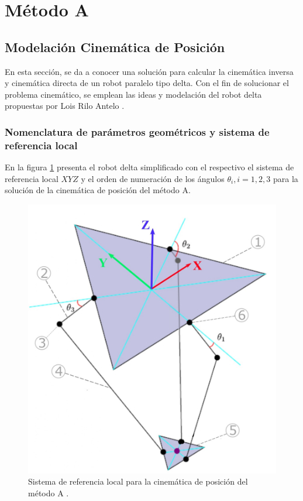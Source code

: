      \newpage
     

\section{Método A}

    \subsection{Modelación Cinemática de Posición}
    
        En esta sección, se da a conocer una solución para calcular la cinemática inversa y cinemática directa de un robot paralelo tipo delta. Con el fin de solucionar el problema cinemático, se emplean las ideas y modelación del robot delta propuestas por Lois Rilo Antelo \cite{Diseno_e_implementacion_de_un_sistema_de_control_para_la_representacion_grafica_a_partir_de_imagenes}.
        
        \subsubsection{Nomenclatura de parámetros geométricos y sistema de referencia local}
        En la figura  \ref{f:Cap4_Metodo_A_Modelacion_Cinematica_Posicion_1}  presenta el robot delta simplificado con el respectivo el sistema de referencia local $XYZ$ y el orden de numeración de los ángulos $\theta_i , i=1,2,3$ para la solución de la cinemática de posición del método A.
        
        \begin{figure}[htb]
             \centering
             \includegraphics[width=0.45\linewidth]{Main/Chapter4/Images4/DIBUJO2.jpg}
              \caption{Sistema de referencia local para la cinemática de posición del método A \cite{Diseno_e_implementacion_de_un_sistema_de_control_para_la_representacion_grafica_a_partir_de_imagenes}. }
              \label{f:Cap4_Metodo_A_Modelacion_Cinematica_Posicion_1}
        \end{figure}

